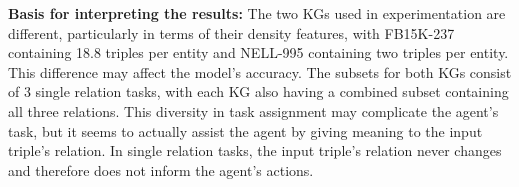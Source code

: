 \noindent \textbf{Basis for interpreting the results: } The two KGs used in experimentation are different, particularly in terms of their density features, with FB15K-237 containing 18.8 triples per entity and NELL-995 containing two triples per entity. This difference may affect the model's accuracy. %
The subsets for both KGs consist of 3 single relation tasks, with each KG also having a combined subset containing all three relations. This diversity in task assignment may complicate the agent's task, but it seems to actually assist the agent by giving meaning to the input triple's relation. In single relation tasks, the input triple's relation never changes and therefore does not inform the agent's actions. \par




